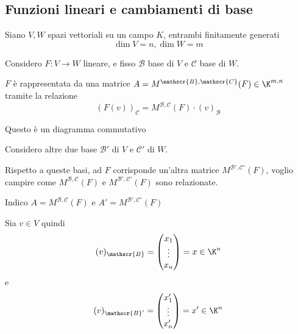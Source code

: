\subsection{Funzioni lineari e cambiamenti di base}

Siano $ V, W $ spazi vettoriali su un campo $ K$, entrambi finitamente generati \[
    \dim  V = n, \dim W =m
\]

Considero $ F:V\to W $ lineare, e fisso $ \mathscr{B} $ base di $ V $ e $ \mathscr{C} $ base di $ W $. 

$ F $ è rappresentata da una matrice $A = M^{ \mathscr{B}, \mathscr{C}}(F) \in \K^{m,n}$ tramite la relazione \[(F(v))_{ \mathscr{C}}=M^{ \mathscr{B}, \mathscr{C}}(F)\cdot(v)_{\mathscr{B}}\]

\begin{center}
\end{center}

Questo è un diagramma commutativo

Considero altre due base $ \mathscr{B}' $ di $ V$ e $ \mathscr{C}' $ di $ W $. 

Rispetto a queste basi, ad $ F $ corrisponde un'altra matrice $ M^{ \mathscr{B}', \mathscr{C}'}(F) $, voglio campire come $ M^{ \mathscr{B}, \mathscr{C}}(F) $ e $ M^{ \mathscr{B}', \mathscr{C}'}(F) $ sono relazionate.

Indico $ A=M^{ \mathscr{B}, \mathscr{C}}(F) $ e $ A'=M^{ \mathscr{B}', \mathscr{C}'}(F) $

Sia $ v \in V $ quindi \[
    (v)_{ \mathscr{B}}=\begin{pmatrix}
        x_1\\ \vdots \\ x_{n} 
    \end{pmatrix}= x \in \K^n
\] e \[
    (v)_{ \mathscr{B}'}=\begin{pmatrix}
        x_1'\\ \vdots \\ x_{n}'
    \end{pmatrix}= x' \in \K^n
\]


